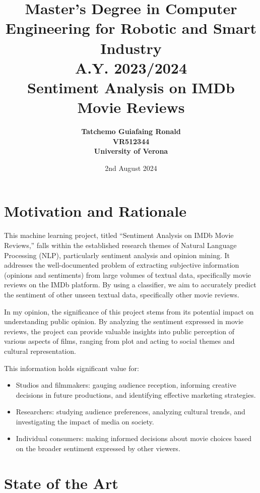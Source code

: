 \documentclass{article}
\title{\textbf{Master's Degree in Computer Engineering for Robotic and Smart Industry \\ A.Y. 2023/2024 \\ Sentiment Analysis on IMDb Movie Reviews}}
\author{\textbf{Tatchemo Guiafaing Ronald \\ VR512344 \\ University of Verona}}
\date{2nd August 2024} %
\begin{document}

\justifying

\maketitle

\tableofcontents

\newpage

\section{Motivation and Rationale}

This machine learning project, titled “Sentiment Analysis on IMDb Movie Reviews,” falls within the established research themes of Natural Language Processing (NLP), particularly sentiment analysis and opinion mining. It addresses the well-documented problem of extracting subjective information (opinions and sentiments) from large volumes of textual data, specifically movie reviews on the IMDb platform. By using a classifier, we aim to accurately predict the sentiment of other unseen textual data, specifically other movie reviews.

In my opinion, the significance of this project stems from its potential impact on understanding public opinion. By analyzing the sentiment expressed in movie reviews, the project can provide valuable insights into public perception of various aspects of films, ranging from plot and acting to social themes and cultural representation. 

This information holds significant value for:
\begin{itemize}
    \item Studios and filmmakers: gauging audience reception, informing creative decisions in future productions, and identifying effective marketing strategies.
    \item Researchers: studying audience preferences, analyzing cultural trends, and investigating the impact of media on society.
    \item Individual consumers: making informed decisions about movie choices based on the broader sentiment expressed by other viewers.
\end{itemize}

\newpage

\section{State of the Art}
\end{document}
